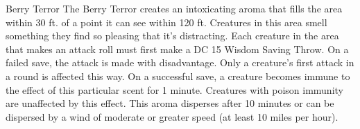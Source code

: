 \begin{DndMonster}[width=0.5\textwidth]{Berry Terror}
    The Berry Terror creates an intoxicating aroma that fills the area within 30 ft. of a point it can see within 120 ft. Creatures in this area smell something they find so pleasing that it's distracting. Each creature in the area that makes an attack roll must first make a DC 15 Wisdom Saving Throw. On a failed save, the attack is made with disadvantage. Only a creature's first attack in a round is affected this way. On a successful save, a creature becomes immune to the effect of this particular scent for 1 minute. Creatures with poison immunity are unaffected by this effect. This aroma disperses after 10 minutes or can be dispersed by a wind of moderate or greater speed  (at least 10 miles per hour).
\end{DndMonster}


